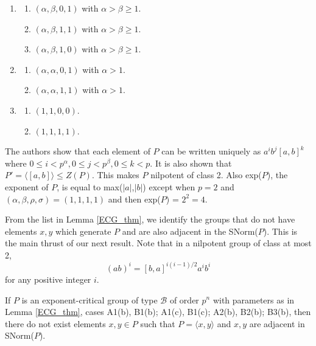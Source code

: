 \begin{lemma}
    \begin{enumerate}
        \item[B1.]   \begin{enumerate}
                    \item $(\alpha, \beta, 0, 1)$ with $\alpha > \beta \geq 1$. \label{2_1a}
                    \item $(\alpha, \beta, 1, 1)$ with $\alpha > \beta \geq 1$. \label{2_1b}
                    \item $(\alpha, \beta, 1, 0)$ with $\alpha > \beta \geq 1$. \label{2_1c}
                \end{enumerate}
        \item[B2.]   \begin{enumerate}
                    \item $(\alpha, \alpha, 0, 1)$ with $\alpha > 1$. \label{2_2a}
                    \item $(\alpha, \alpha, 1, 1)$ with $\alpha > 1$. \label{2_2b}
                \end{enumerate}
        \item[B3.]   \begin{enumerate}
                    \item $(1,1,0,0)$. \label{2_3a}
                    \item $(1,1,1,1)$. \label{2_3b}
                \end{enumerate}
    \end{enumerate}
\end{lemma}

The authors show that each element of $P$ can be written uniquely as $a^ib^j [a, b]^k$ where $ 0 \leq i < p^{\alpha}, 0 \leq j < p^{\beta}, 0 \leq k <p$. It is also shown that $P' = \langle [a, b] \rangle \leq Z(P)$. This makes $P$ nilpotent of class 2. Also exp($P$), the exponent of $P$, is equal to max($|a|$,$|b|$) except when  $p=2$ and $(\alpha, \beta, \rho, \sigma)=(1,1,1,1)$ and then exp($P$) = $2^2=4$. 

From the list in Lemma \ref{ECG_thm}, we identify the groups that do not have elements $x, y$ which generate $P$ and are also adjacent in the SNorm($P$). This is the main thrust of our next result. Note that in a nilpotent group of class at most 2, 
\begin{equation}\label{id_ab}
    (ab)^i=[b,a]^{i(i-1)/2}a^ib^i
\end{equation} for any positive integer $i$.

\begin{lemma}\label{ecg_case_1b_1c_2b}
    If $P$ is an exponent-critical group of type $\mathcal{B}$ of order $p^n$ with parameters as in Lemma \ref{ECG_thm}, cases A1(b), B1(b); A1(c), B1(c); A2(b), B2(b); B3(b), then there do not exist elements $x,y \in P$ such that $P= \langle x,y \rangle$ and $x,y$ are adjacent in SNorm($P$).
\end{lemma}

